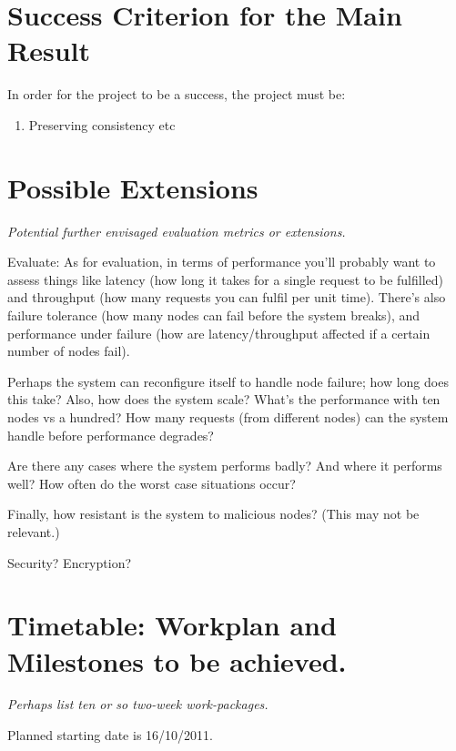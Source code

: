 \section*{Success Criterion for the Main Result}


In order for the project to be a success, the project must be:
\begin{enumerate}

\item Preserving consistency etc

\end{enumerate}




\section*{Possible Extensions}

{\em Potential further envisaged evaluation metrics or extensions.}

Evaluate:
As for evaluation, in terms of performance you'll probably want to assess
things like latency (how long it takes for a single request to be fulfilled)
and throughput (how many requests you can fulfil per unit time). There's also
failure tolerance (how many nodes can fail before the system breaks), and
performance under failure (how are latency/throughput affected if a certain
number of nodes fail).

Perhaps the system can reconfigure itself to handle node failure; how long does
this take? Also, how does the system scale? What's the performance with ten
nodes vs a hundred? How many requests (from different nodes) can the system
handle before performance degrades?

Are there any cases where the system performs badly? And where it performs
well? How often do the worst case situations occur?

Finally, how resistant is the system to malicious nodes? (This may not be
relevant.)

Security? Encryption?

\section*{Timetable: Workplan and Milestones to be achieved.}


{\em Perhaps list ten or so two-week work-packages.}

Planned starting date is 16/10/2011.

